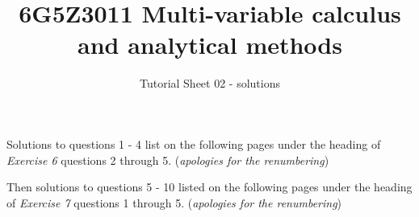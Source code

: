 \documentclass[a4paper]{amsart}
\begin{document}
\title{6G5Z3011 Multi-variable calculus and analytical methods}
\author{Tutorial Sheet 02 - solutions}
\maketitle

Solutions to questions 1 - 4 list on the following pages under the heading of \textit{Exercise 6} questions 2 through 5. (\textit{apologies for the renumbering})

Then solutions to questions 5 - 10 listed on the following pages under the heading of \textit{Exercise 7} questions 1 through 5. (\textit{apologies for the renumbering})


\end{document}
